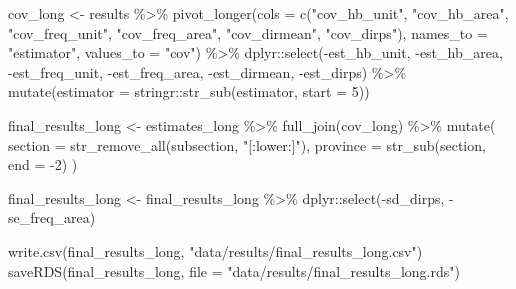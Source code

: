 \documentclass[12pt,twoside]{reedthesis}
\newenvironment{Shaded}{\begin{snugshade}}{\end{snugshade}}
\newcommand{\AttributeTok}[1]{\textcolor[rgb]{0.77,0.63,0.00}{#1}}
\newcommand{\DecValTok}[1]{\textcolor[rgb]{0.00,0.00,0.81}{#1}}
\newcommand{\FunctionTok}[1]{\textcolor[rgb]{0.00,0.00,0.00}{#1}}
\newcommand{\NormalTok}[1]{#1}
\newcommand{\OtherTok}[1]{\textcolor[rgb]{0.56,0.35,0.01}{#1}}
\newcommand{\SpecialCharTok}[1]{\textcolor[rgb]{0.00,0.00,0.00}{#1}}
\newcommand{\StringTok}[1]{\textcolor[rgb]{0.31,0.60,0.02}{#1}}
\begin{document}
\begin{Shaded}
\begin{Highlighting}[]
\NormalTok{cov\_long }\OtherTok{\textless{}{-}}\NormalTok{ results }\SpecialCharTok{\%\textgreater{}\%}
  \FunctionTok{pivot\_longer}\NormalTok{(}\AttributeTok{cols =} \FunctionTok{c}\NormalTok{(}\StringTok{"cov\_hb\_unit"}\NormalTok{, }\StringTok{"cov\_hb\_area"}\NormalTok{,}
                        \StringTok{"cov\_freq\_unit"}\NormalTok{, }\StringTok{"cov\_freq\_area"}\NormalTok{,}
                        \StringTok{"cov\_dirmean"}\NormalTok{, }\StringTok{"cov\_dirps"}\NormalTok{),}
               \AttributeTok{names\_to =} \StringTok{"estimator"}\NormalTok{,}
               \AttributeTok{values\_to =} \StringTok{"cov"}\NormalTok{) }\SpecialCharTok{\%\textgreater{}\%}
\NormalTok{  dplyr}\SpecialCharTok{::}\FunctionTok{select}\NormalTok{(}\SpecialCharTok{{-}}\NormalTok{est\_hb\_unit, }\SpecialCharTok{{-}}\NormalTok{est\_hb\_area,}
                \SpecialCharTok{{-}}\NormalTok{est\_freq\_unit, }\SpecialCharTok{{-}}\NormalTok{est\_freq\_area,}
                \SpecialCharTok{{-}}\NormalTok{est\_dirmean, }\SpecialCharTok{{-}}\NormalTok{est\_dirps) }\SpecialCharTok{\%\textgreater{}\%}
  \FunctionTok{mutate}\NormalTok{(}\AttributeTok{estimator =}\NormalTok{ stringr}\SpecialCharTok{::}\FunctionTok{str\_sub}\NormalTok{(estimator, }\AttributeTok{start =} \DecValTok{5}\NormalTok{))}

\NormalTok{final\_results\_long }\OtherTok{\textless{}{-}}\NormalTok{ estimates\_long }\SpecialCharTok{\%\textgreater{}\%}
  \FunctionTok{full\_join}\NormalTok{(cov\_long) }\SpecialCharTok{\%\textgreater{}\%}
  \FunctionTok{mutate}\NormalTok{(}
    \AttributeTok{section =} \FunctionTok{str\_remove\_all}\NormalTok{(subsection, }\StringTok{"[:lower:]"}\NormalTok{),}
    \AttributeTok{province =} \FunctionTok{str\_sub}\NormalTok{(section, }\AttributeTok{end =} \SpecialCharTok{{-}}\DecValTok{2}\NormalTok{)}
\NormalTok{  )}

\NormalTok{final\_results\_long }\OtherTok{\textless{}{-}}\NormalTok{ final\_results\_long }\SpecialCharTok{\%\textgreater{}\%}
\NormalTok{  dplyr}\SpecialCharTok{::}\FunctionTok{select}\NormalTok{(}\SpecialCharTok{{-}}\NormalTok{sd\_dirps, }\SpecialCharTok{{-}}\NormalTok{se\_freq\_area)}
\end{Highlighting}
\end{Shaded}
\begin{Shaded}
\begin{Highlighting}[]
\FunctionTok{write.csv}\NormalTok{(final\_results\_long,}
          \StringTok{"data/results/final\_results\_long.csv"}\NormalTok{)}
\FunctionTok{saveRDS}\NormalTok{(final\_results\_long,}
        \AttributeTok{file =} \StringTok{"data/results/final\_results\_long.rds"}\NormalTok{)}
\end{Highlighting}
\end{Shaded}
\backmatter
\end{document}
